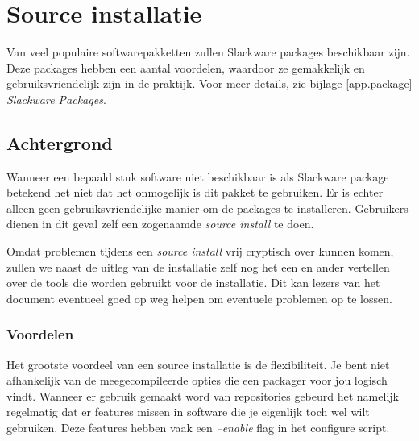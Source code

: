 %
%
%
%

\chapter{Source installatie}\label{app.source}
Van veel populaire softwarepakketten zullen Slackware packages beschikbaar zijn. Deze packages hebben een aantal voordelen, waardoor ze gemakkelijk en gebruiksvriendelijk zijn in de praktijk. Voor meer details, zie bijlage \ref{app.package} \emph{Slackware Packages}. 

\section{Achtergrond}
Wanneer een bepaald stuk software niet beschikbaar is als Slackware package betekend het niet dat het onmogelijk is dit pakket te gebruiken. Er is echter alleen geen gebruiksvriendelijke manier om de packages te installeren. Gebruikers dienen in dit geval zelf een zogenaamde \emph{source install} te doen. 

Omdat problemen tijdens een \emph{source install} vrij cryptisch over kunnen komen, zullen we naast de uitleg van de installatie zelf nog het een en ander vertellen over de tools die worden gebruikt voor de installatie. Dit kan lezers van het document eventueel goed op weg helpen om eventuele problemen op te lossen. 

\subsection{Voordelen}
Het grootste voordeel van een source installatie is de flexibiliteit. Je bent niet afhankelijk van de meegecompileerde opties die een packager voor jou logisch vindt. Wanneer er gebruik gemaakt word van repositories gebeurd het namelijk regelmatig dat er features missen in software die je eigenlijk toch wel wilt gebruiken. Deze features hebben vaak een \emph{--enable} flag in het configure script. 

